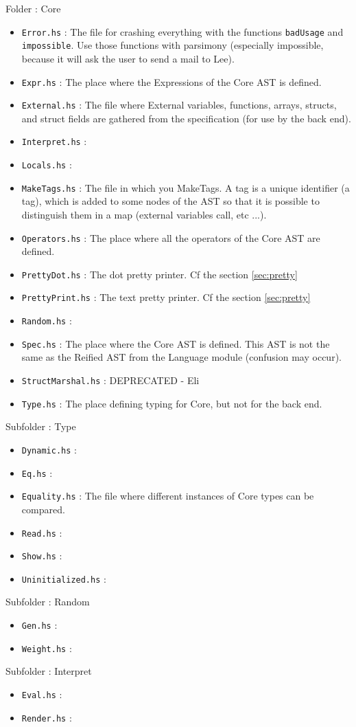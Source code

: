 Folder : Core
\begin{itemize}
	\item \texttt{Error.hs} : The file for crashing everything with the functions \texttt{badUsage} and \texttt{impossible}. Use those functions with parsimony (especially impossible, because it will ask the user to send a mail to Lee).
	\item \texttt{Expr.hs} : The place where the Expressions of the Core AST is defined. 
	\item \texttt{External.hs} : The file where External variables, functions, arrays, structs, and struct fields are gathered from the specification (for use by the back end).
	\item \texttt{Interpret.hs} :
	\item \texttt{Locals.hs} :
	\item \texttt{MakeTags.hs} : The file in which you MakeTags. A tag is a unique identifier (a tag), which is added to some nodes of the AST so that it is possible to distinguish them in a map (external variables call, etc ...).
	\item \texttt{Operators.hs} : The place where all the operators of the Core AST are defined.
	\item \texttt{PrettyDot.hs} : The dot pretty printer. Cf the section \ref{sec:pretty}
	\item \texttt{PrettyPrint.hs} : The text pretty printer. Cf the section \ref{sec:pretty}
	\item \texttt{Random.hs} :
	\item \texttt{Spec.hs} : The place where the Core AST is defined. This AST is not the same as the Reified AST from the Language module (confusion may occur).
	\item \texttt{StructMarshal.hs} : DEPRECATED - Eli
	\item \texttt{Type.hs} : The place defining typing for Core, but not for the back end.
\end{itemize}

Subfolder : Type
\begin{itemize}
	\item \texttt{Dynamic.hs} : 
	\item \texttt{Eq.hs} : 
	\item \texttt{Equality.hs} : The file where different instances of Core types can be compared.
	\item \texttt{Read.hs} : 
	\item \texttt{Show.hs} : 
	\item \texttt{Uninitialized.hs} : 
\end{itemize}


Subfolder : Random
\begin{itemize}
	\item \texttt{Gen.hs} :
	\item \texttt{Weight.hs} : 
\end{itemize}


Subfolder : Interpret
\begin{itemize}
	\item \texttt{Eval.hs} :
	\item \texttt{Render.hs} : 
\end{itemize}